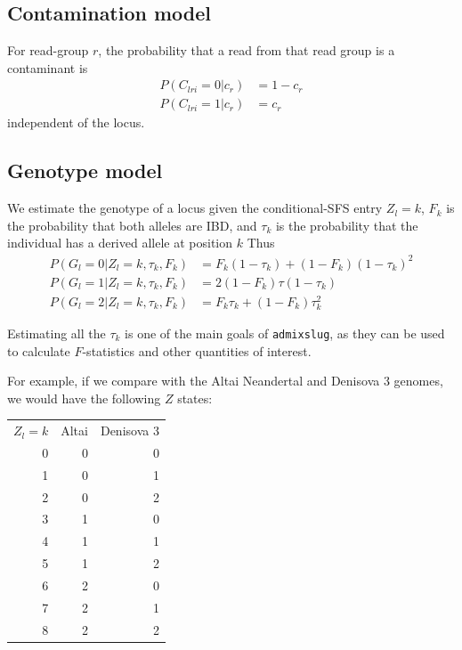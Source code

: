 \documentclass[10pt,a4paper]{article}
\begin{document}
\subsection*{Contamination model}
For read-group $r$, the probability that a read from that read group is a contaminant is 
\begin{align}
P(C_{lri} = 0 | c_r) &= 1-c_r\nonumber\\
P(C_{lri} = 1 | c_r) &= c_r
\end{align}
independent of the locus.

\subsection*{Genotype model}
We estimate the genotype of a locus given the conditional-SFS entry $Z_l=k$, $F_k$ is the probability that both alleles are IBD, and $\tau_k$ is the probability that the individual has a derived allele at position $k$
Thus
\begin{align}
P(G_l = 0| Z_l=k, \tau_k, F_k) &= F_k (1-\tau_k) + (1-F_k) (1-\tau_k)^2\nonumber\\
P(G_l = 1| Z_l=k, \tau_k, F_k) &= 2(1-F_k) \tau(1-\tau_k)\nonumber\\
P(G_l = 2| Z_l=k, \tau_k, F_k) &= F_k \tau_k + (1-F_k) \tau_k^2\label{eq:prg}
\end{align}

Estimating all the $\tau_k$ is one of the main goals of \texttt{admixslug}, as they can be used to calculate $F$-statistics and other quantities of interest.

For example, if we compare with the Altai Neandertal and Denisova 3 genomes, we would have the following $Z$ states:
\begin{table}[!ht]
	\begin{center}
		
		\begin{tabular}{r r r }
			$Z_l=k$ & Altai & Denisova 3 \\
			0 & 0 & 0 \\
			1 & 0 & 1 \\
			2 & 0 & 2 \\
			3 & 1 & 0 \\
			4 & 1 & 1 \\
			5 & 1 & 2 \\
			6 & 2 & 0 \\
			7 & 2 & 1 \\
			8 & 2 & 2 \\
		\end{tabular}
	\end{center}
\end{table}
\end{document}
